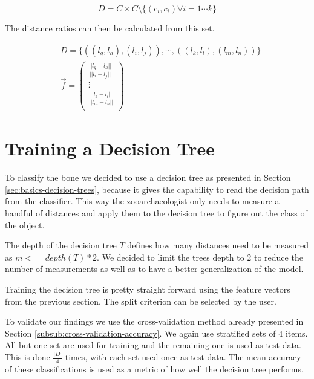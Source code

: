 \documentclass[pdftex,12pt,a4paper]{report}
\begin{document}
\begin{equation}
D = C \times C \setminus \{ (c_i, c_i) \forall i = 1 \cdots k \}
\end{equation}

The distance ratios can then be calculated from this set.

\begin{equation}
\begin{split}
& D = \{ ((l_g, l_h), (l_i, l_j)), \cdots, ((l_k, l_l), (l_m, l_n)) \} \\
& \vec{f} = \left( \begin{array}{c}
\frac{||l_g - l_h||}{||l_i - l_j||} \\
\vdots \\
\frac{||l_k - l_l||}{||l_m - l_n||} \\
\end{array} \right)
\end{split}
\end{equation}

\section{Training a Decision Tree}

To classify the bone we decided to use a decision tree as presented in Section \ref{sec:basics-decision-trees}, because it gives the capability to read the decision path from the classifier. This way the zooarchaeologist only needs to measure a handful of distances and apply them to the decision tree to figure out the class of the object.

The depth of the decision tree $T$ defines how many distances need to be measured as $m <= depth(T) * 2$. We decided to limit the trees depth to 2 to reduce the number of measurements as well as to have a better generalization of the model.

Training the decision tree is pretty straight forward using the feature vectors from the previous section. The split criterion can be selected by the user.

To validate our findings we use the cross-validation method already presented in Section \ref{subsub:cross-validation-accuracy}. We again use stratified sets of 4 items. All but one set are used for training and the remaining one is used as test data. This is done $\frac{|D|}{4}$ times, with each set used once as test data. The mean accuracy of these classifications is used as a metric of how well the decision tree performs.
\end{document}
